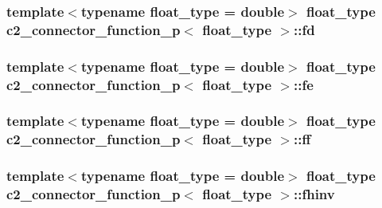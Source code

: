 \subsubsection[{\texorpdfstring{fd}{fd}}]{\setlength{\rightskip}{0pt plus 5cm}template$<$typename float\+\_\+type = double$>$ float\+\_\+type {\bf c2\+\_\+connector\+\_\+function\+\_\+p}$<$ float\+\_\+type $>$\+::fd\hspace{0.3cm}{\ttfamily [protected]}}\hypertarget{classc2__connector__function__p_a2d06e77813b110a2c6ce09399d246704}{}\label{classc2__connector__function__p_a2d06e77813b110a2c6ce09399d246704}
\subsubsection[{\texorpdfstring{fe}{fe}}]{\setlength{\rightskip}{0pt plus 5cm}template$<$typename float\+\_\+type = double$>$ float\+\_\+type {\bf c2\+\_\+connector\+\_\+function\+\_\+p}$<$ float\+\_\+type $>$\+::fe\hspace{0.3cm}{\ttfamily [protected]}}\hypertarget{classc2__connector__function__p_a64b954176b723477abf827e67bcfb7e7}{}\label{classc2__connector__function__p_a64b954176b723477abf827e67bcfb7e7}
\subsubsection[{\texorpdfstring{ff}{ff}}]{\setlength{\rightskip}{0pt plus 5cm}template$<$typename float\+\_\+type = double$>$ float\+\_\+type {\bf c2\+\_\+connector\+\_\+function\+\_\+p}$<$ float\+\_\+type $>$\+::ff\hspace{0.3cm}{\ttfamily [protected]}}\hypertarget{classc2__connector__function__p_a39ca7caba5b003e6684eaf6c80920a8a}{}\label{classc2__connector__function__p_a39ca7caba5b003e6684eaf6c80920a8a}
\subsubsection[{\texorpdfstring{fhinv}{fhinv}}]{\setlength{\rightskip}{0pt plus 5cm}template$<$typename float\+\_\+type = double$>$ float\+\_\+type {\bf c2\+\_\+connector\+\_\+function\+\_\+p}$<$ float\+\_\+type $>$\+::fhinv\hspace{0.3cm}{\ttfamily [protected]}}\hypertarget{classc2__connector__function__p_aa9bafcf757d0607f897ab5e7d0acfb72}{}\label{classc2__connector__function__p_aa9bafcf757d0607f897ab5e7d0acfb72}
